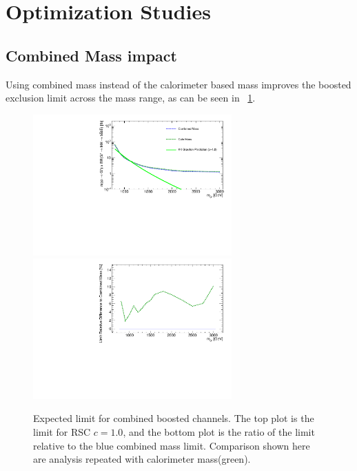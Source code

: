\section{Optimization Studies}

\subsection{Combined Mass impact}
\label{sec:app-optimization-cbmass}
Using combined mass instead of the calorimeter based mass improves the boosted exclusion limit across the mass range, as can be seen in ~\ref{fig:app-optimization-mass}.

\begin{figure}[htbp!]
\begin{center}
\includegraphics[width=0.68\textwidth,angle=-90]{figures/boosted/AppendixOptimization/CompareLimits_HH_BoostedNewRun2-mass_c10.pdf}\\
\includegraphics[width=0.68\textwidth,angle=-90]{figures/boosted/AppendixOptimization/CompareLimits_HH_BoostedNewRun2-mass_c10_ratio.pdf}
  \caption{Expected limit for combined boosted channels. The top plot is the limit for RSC $c=1.0$, and the bottom plot is the ratio of the limit relative to the blue combined mass limit. Comparison shown here are analysis repeated with calorimeter mass(green).}
  \label{fig:app-optimization-mass}
\end{center}
\end{figure}


